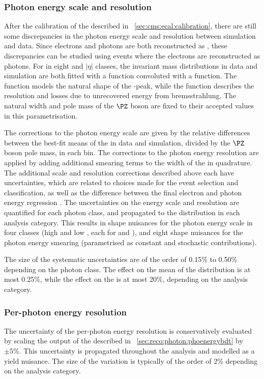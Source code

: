 \subsubsection{Photon energy scale and resolution}
After the calibration of the \ECAL described in \Sec~\ref{sec:cms:ecal:calibration}, there are still some discrepancies in the photon energy scale and resolution between simulation and data. Since electrons and photons are both reconstructed as \SC\s, these discrepancies can be studied using \Zee events where the electrons are reconstructed as photons.
For \SC\s in eight \RNINE and $|\eta|$ classes, the invariant mass distributions in data and simulation are both fitted with a \BW function convoluted with a \CB function. The \BW function models the natural shape of the \PZ-peak, while the \CB function describes the \ECAL resolution and losses due to unrecovered energy from bremsstrahlung. The natural width and pole mass of the $\PZ$ boson are fixed to their accepted values~\cite{PDGBooklet} in this parametrisation. 

The corrections to the photon energy scale are given by the relative differences between the best-fit means of the \CB in data and simulation, divided by the $\PZ$ boson pole mass, in each bin. The corrections to the photon energy resolution are applied by adding additional smearing terms to the width of the \CB in quadrature. The additional scale and resolution corrections described above each have uncertainties, which are related to choices made for the \Zee event selection and classification, as well as the difference between the final electron and photon energy regression \BDT\s. The uncertainties on the energy scale and resolution are quantified for each photon class, and propagated to the \mgg distribution in each analysis category. This results in shape nuisances for the photon energy scale in four classes (high and low \RNINE, each for \EB and \EE), and eight shape nuisances for the photon energy smearing (parametrised as constant and stochastic contributions). 

The size of the systematic uncertainties are of the order of 0.15\% to 0.50\% depending on the photon class. The effect on the mean of the \mgg distribution is at most 0.25\%, while the effect on the \effSigma is at most 20\%, depending on the analysis category.

\subsubsection{Per-photon energy resolution}
The uncertainty of the per-photon energy resolution is conservatively evaluated by scaling the output of the \PhoEnergyBdt described in \Sec~\ref{sec:reco:photon:phoenergybdt} by $\pm5\%$. This uncertainty is propagated throughout the analysis and modelled as a yield nuisance. The size of the variation is typically of the order of 2\% depending on the analysis category.

